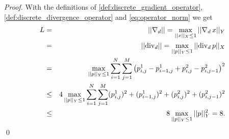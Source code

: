     \begin{proof} %

        With the definitions of \ref{def:discrete_gradient_operator}, \ref{def:discrete_divergence_operator} and \ref{eq:operator_norm} we get
            \begin{eqnarray}
                L &=& ||\nabla_{d}|| = \max_{||x||_{X} \le 1} ||\nabla_{d}\,x||_{Y} \notag \\
                &=& ||\textnormal{div}_{d}|| = \max_{||p||_{Y} \le 1} ||\textnormal{div}_{d}\,p||_{X} \notag \\
                &=& \max_{||p||_{Y} \le 1} \sum_{i = 1}^{N} \sum_{j = 1}^{M} \big( p^{1}_{i, j} - p^{1}_{i-1, j} + p^{2}_{i, j} - p^{2}_{i, j-1} \big)^{2} \notag \\
                &\le& 4 \max_{||p||_{Y} \le 1} \sum_{i = 1}^{N} \sum_{j = 1}^{M} (p^{1}_{i, j})^{2} + (p^{1}_{i-1, j})^{2} + (p^{2}_{i, j})^{2} + (p^{2}_{i, j-1})^{2} \notag \\
                &\le& 8 \max_{||p||_{Y} \le 1} ||p||^{2}_{Y} = 8.
                \label{eq:bound_on_discrete_gradient}
            \end{eqnarray}\qed
    \end{proof}

